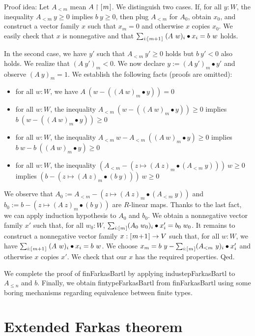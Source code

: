 \documentclass[]{article}
\renewcommand{\.}{\hskip .75pt}
\newcommand{\fin}[1]{[\.#1\.]}
\let\r=\rightarrow
\begin{document}
\medskip \noindent
Proof idea:
Let $A_{<m}$ mean $A \restriction \fin{m}$.
We distinguish two cases. If, for all $y : W$, the inequality
$A_{<m}~y \ge 0$ implies $b~y \ge 0$, then plug $A_{<m}$
for $A_0$, obtain $x_0$, and construct a vector family $x$ such that
$x_m = 0$ and otherwise $x$ copies $x_0$. We easily check that
$x$ is nonnegative and that
$ \sum_{i : \fin{m+1}}\; (A~w)_i \bullet x_i = b~w $ holds.

In the second case, we have $y'$ such that $A_{<m}~y' \ge 0$
holds but $b~y' < 0$ also holds. We realize that $(A~y')_m < 0$.
We now declare $y := (A~y')_m \bullet y'$ and observe
$(A~y)_m = 1$. We establish the following facts (proofs are omitted):
\begin{itemize}
\item for all $w : W$, we have $A~(w - ((A~w)_m \bullet y)) = 0$
\item for all $w : W$, the inequality $A_{<m}~(w - ((A~w)_m \bullet y)) \ge 0$
implies $b~(w - ((A~w)_m \bullet y)) \ge 0$
\item for all $w : W$, the inequality $A_{<m}~w - A_{<m}~((A~w)_m \bullet y) \ge 0$
implies $b~w - b~((A~w)_m \bullet y) \ge 0$
\item for all $w : W$, the inequality $(A_{<m} - (z \mapsto (A~z)_m \bullet (A_{<m}~y)))~w \ge 0$
implies $(b - (z \mapsto (A~z)_m \bullet (b~y)))~w \ge 0$
\end{itemize}
We observe that
$A_0 := A_{<m} - (z \mapsto (A~z)_m \bullet (A_{<m}~y))$
and
$b_0 := b - (z \mapsto (A~z)_m \bullet (b~y))$
are $R$-linear maps.
Thanks to the last fact, we can apply induction hypothesis to $A_0$ and $b_0$.
We obtain a nonnegative vector family $x'$ such that,
for all $w_0 : W$, $ \sum_{i : \fin{m}} (A_0\;w_0)_i \bullet x'_i = b_0\;w_0 $.
It remains to construct a nonnegative vector family $x : \fin{m\!+\!1} \r V$
such that, for all $w : W$, we have
$ \sum_{i : \fin{m+1}}\; (A~w)_i \bullet x_i = b~w $.
We choose $x_m = b~y - \sum_{i : \fin{m}} (A_{<m}~y)_i \bullet x'_i$
and otherwise $x$ copies $x'$. We check that our $x$ has the required
properties. Qed.

\medskip
We complete the proof of finFarkasBartl by applying industepFarkasBartl
to $A_{\le n}$ and $b$. Finally, we obtain fintypeFarkasBartl from
finFarkasBartl using some boring mechanisms regarding equivalence between
finite types.


\section {Extended Farkas theorem}
\end{document}
